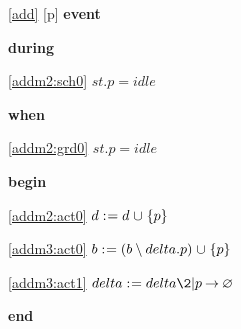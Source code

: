 \noindent \ref{add} [p] \textbf{event}
\begin{block}
  \item   \textbf{during}
  \begin{block}
  \item[ \eqref{addm2:sch0} ]{$st.p = idle $} %
  \end{block}
  \item   \textbf{when}
  \begin{block}
  \item[ \eqref{addm2:grd0} ]{$st.p = idle $} %
  \end{block}
  \item   \textbf{begin}
  \begin{block}
  \item[ \eqref{addm2:act0} ]{$d \mathrel{:\mkern1mu=} d \mathbin{\mkern1mu\cup\mkern1mu} \{p\}$} %
  \item[ \eqref{addm3:act0} ]{$b \mathrel{:\mkern1mu=} (b\setminus delta.p) \mathbin{\mkern1mu\cup\mkern1mu} \{p\}$} %
  \item[ \eqref{addm3:act1} ]{$delta \bcmeq delta \2| p \fun \emptyset $} %
  \end{block}
  \item   \textbf{end} \\
\end{block}
